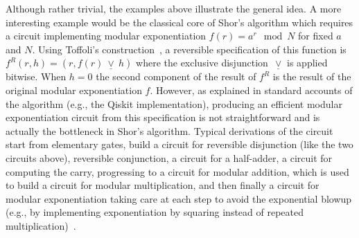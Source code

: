 Although rather trivial, the examples above illustrate the general idea. A more interesting example would be the
classical core of Shor's algorithm which requires a circuit implementing modular exponentiation $f(r) = a^{r} \mod N$
for fixed $a$ and $N$. Using Toffoli's construction~\citeyearpar{Toffoli:1980}, a reversible specification of this
function is $f^R(r,h) = (r, f(r)~\underline{\vee}~ h)$ where the exclusive disjunction~$\underline{\vee}$ is applied
bitwise. When $h=0$ the second component of the result of $f^R$ is the result of the original modular exponentiation
$f$.
However, as explained in standard accounts of the algorithm (e.g., the
Qiskit implementation), producing an efficient modular exponentiation circuit
from this specification is not straightforward and is actually the bottleneck in
Shor’s algorithm. Typical derivations of the circuit start from elementary
gates, build a circuit for reversible disjunction (like the two circuits above),
reversible conjunction, a circuit for a half-adder, a circuit for computing the
carry, progressing to a circuit for modular addition, which is used to build a
circuit for modular multiplication, and then finally a circuit for modular
exponentiation taking care at each step to avoid the exponential blowup (e.g.,
by implementing exponentiation by squaring instead of repeated
multiplication)~\cite{shorefficient}.



